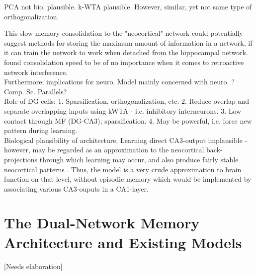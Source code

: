 PCA not bio. plausible. k-WTA plausible. However, similar, yet not same type of orthogonalization.

This slow memory consolidation to the "neocortical" network could potentially suggest methods for storing the maximum amount of information in a network, if it can train the network to work when detached from the hippocampal network. \cite{French2001} found consolidation speed to be of no importance when it comes to retroactive network interference.
\\
Furthermore; implications for neuro. Model mainly concerned with neuro. ? Comp. Sc. Parallels?
\\

Role of DG-cells: 
1. Sparsification, orthogonalization, etc.
2. Reduce overlap and separate overlapping inputs using kWTA - i.e. inhibitory interneurons.
3. Low contact through MF (DG-CA3); sparsification.
4. May be powerful, i.e. force new pattern during learning.
\citep{Rolls1998chpt6}
\\

Biological plausibility of \citep{McClelland1995} architecture. Learning direct CA3-output implausible - however, may be regarded as an approximation to the neocortical back-projections through which learning may occur, and also produce fairly stable neocortical patterns \citep{Rolls1998chpt6}. Thus, the model is a very crude approximation to brain function on that level, without episodic memory which would be implemented by associating various CA3-ouputs in a CA1-layer.

\section{The Dual-Network Memory Architecture and Existing Models}\label{chpt:existing-models}[Needs elaboration]

